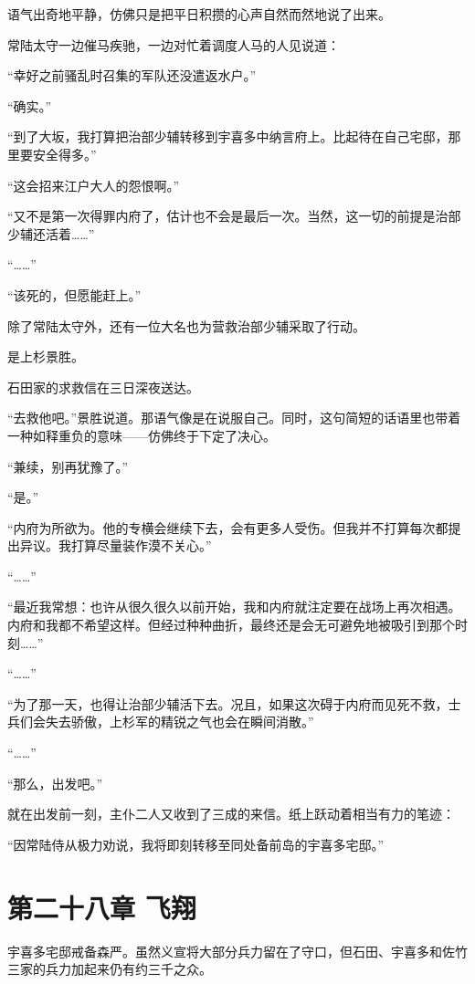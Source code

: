 \documentclass[
]{book}
\begin{document}
语气出奇地平静，仿佛只是把平日积攒的心声自然而然地说了出来。

常陆太守一边催马疾驰，一边对忙着调度人马的人见说道：

``幸好之前骚乱时召集的军队还没遣返水户。''

``确实。''

``到了大坂，我打算把治部少辅转移到宇喜多中纳言府上。比起待在自己宅邸，那里要安全得多。''

``这会招来江户大人的怨恨啊。''

``又不是第一次得罪内府了，估计也不会是最后一次。当然，这一切的前提是治部少辅还活着\ldots\ldots{}''

``\ldots\ldots{}''

``该死的，但愿能赶上。''

除了常陆太守外，还有一位大名也为营救治部少辅采取了行动。

是上杉景胜。

石田家的求救信在三日深夜送达。

``去救他吧。''景胜说道。那语气像是在说服自己。同时，这句简短的话语里也带着一种如释重负的意味------仿佛终于下定了决心。

``兼续，别再犹豫了。''

``是。''

``内府为所欲为。他的专横会继续下去，会有更多人受伤。但我并不打算每次都提出异议。我打算尽量装作漠不关心。''

``\ldots\ldots{}''

``最近我常想：也许从很久很久以前开始，我和内府就注定要在战场上再次相遇。内府和我都不希望这样。但经过种种曲折，最终还是会无可避免地被吸引到那个时刻\ldots\ldots{}''

``\ldots\ldots{}''

``为了那一天，也得让治部少辅活下去。况且，如果这次碍于内府而见死不救，士兵们会失去骄傲，上杉军的精锐之气也会在瞬间消散。''

``\ldots\ldots{}''

``那么，出发吧。''

就在出发前一刻，主仆二人又收到了三成的来信。纸上跃动着相当有力的笔迹：

``因常陆侍从极力劝说，我将即刻转移至同处备前岛的宇喜多宅邸。''

\chapter*{第二十八章 飞翔}\label{ux7b2cux4e8cux5341ux516bux7ae0-ux98deux7fd4}

宇喜多宅邸戒备森严。虽然义宣将大部分兵力留在了守口，但石田、宇喜多和佐竹三家的兵力加起来仍有约三千之众。
\end{document}
